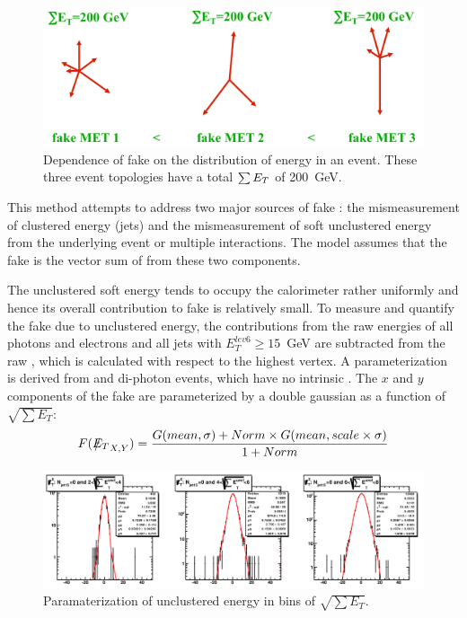 \begin{figure}[htb!]
 \centering
 \includegraphics[scale=0.3,keepaspectratio=true]{./MetModel_fakeMET_topologicalDependence.png}
 \caption[Dependence of fake \met on the distribution of energy in an event.]{Dependence of fake \met on the distribution of energy in an event. These three event topologies have a total $\sum\mbox{$E_T$}$ of 200~GeV.}
 \label{fig:FakeMetTopologyDependance}
\end{figure}

This method attempts to address two major sources of fake \met: the mismeasurement of clustered energy (jets) and the mismeasurement of soft unclustered energy from the underlying event or multiple interactions. The \met model assumes that the fake \met is the vector sum of \met from these two components.

The unclustered soft energy tends to occupy the calorimeter rather uniformly and hence its overall contribution to fake \met is relatively small. To measure and quantify the fake \met due to unclustered energy, the contributions from the raw energies of all photons and electrons and all jets with $E_{T}^{lev6}\geq 15$~GeV are subtracted from the raw \sumet, which is calculated with respect to the highest \sumpt vertex. A parameterization is derived from \zee and di-photon \MC events, which have no intrinsic \met. The $x$ and $y$ components of the fake \met are parameterized by a double gaussian as a function of $\sqrt{\sum E_{T}}$:
\begin{equation}
 F(\met_{X,Y})=\frac{G(mean,\sigma)+Norm\times G(mean,scale\times\sigma)}{1+Norm}
 \label{eqa:MetModel_UnclParameterization}
\end{equation}

\begin{figure}[h!]
 \centering
 \includegraphics[scale=0.4,keepaspectratio=true]{./MetModel_UnclParameterization.png}
 \caption{Paramaterization of unclustered energy in bins of $\sqrt{\sum E_{T}}$.}
 \label{fig:MetModel_UnclParameter}
\end{figure}

